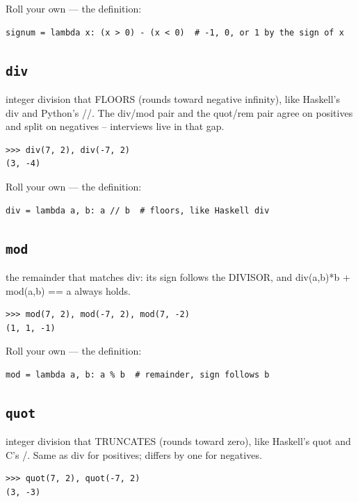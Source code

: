 \documentclass[10pt,letterpaper]{book}
\begin{document}
Roll your own --- the definition:

\begin{lstlisting}[style=ex]
signum = lambda x: (x > 0) - (x < 0)  # -1, 0, or 1 by the sign of x
\end{lstlisting}

\subsection{\texttt{div}}\label{def:div}
integer division that FLOORS (rounds toward negative infinity), like Haskell's div and Python's //. The div/mod pair and the quot/rem pair agree on positives and split on negatives -- interviews live in that gap.
\begin{lstlisting}[style=ex]
>>> div(7, 2), div(-7, 2)
(3, -4)
\end{lstlisting}

Roll your own --- the definition:

\begin{lstlisting}[style=ex]
div = lambda a, b: a // b  # floors, like Haskell div
\end{lstlisting}
\subsection{\texttt{mod}}\label{def:mod}
the remainder that matches div: its sign follows the DIVISOR, and div(a,b)*b + mod(a,b) == a always holds.
\begin{lstlisting}[style=ex]
>>> mod(7, 2), mod(-7, 2), mod(7, -2)
(1, 1, -1)
\end{lstlisting}

Roll your own --- the definition:

\begin{lstlisting}[style=ex]
mod = lambda a, b: a % b  # remainder, sign follows b
\end{lstlisting}
\subsection{\texttt{quot}}\label{def:quot}
integer division that TRUNCATES (rounds toward zero), like Haskell's quot and C's /. Same as div for positives; differs by one for negatives.
\begin{lstlisting}[style=ex]
>>> quot(7, 2), quot(-7, 2)
(3, -3)
\end{lstlisting}
\end{document}
